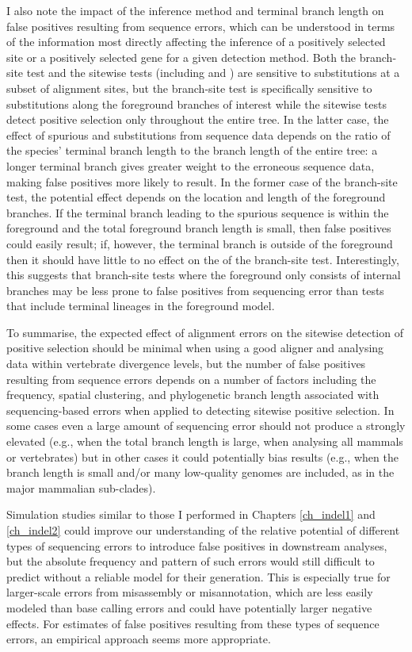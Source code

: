 I also note the impact of the inference method and terminal branch
length on false positives resulting from sequence errors, which can be
understood in terms of the information most directly affecting the
inference of a positively selected site or a positively selected gene
for a given detection method. Both the branch-site test and the
sitewise tests (including \slr and \pamlEight) are sensitive to
substitutions at a subset of alignment sites, but the branch-site test
is specifically sensitive to substitutions along the foreground
branches of interest while the sitewise tests detect positive
selection only throughout the entire tree. In the latter case, the
effect of spurious \syn and \nsyn substitutions from sequence data
depends on the ratio of the species' terminal branch length to the
branch length of the entire tree: a longer terminal branch gives
greater weight to the erroneous sequence data, making false positives
more likely to result. In the former case of the branch-site test, the
potential effect depends on the location and length of the foreground
branches. If the terminal branch leading to the spurious sequence is
within the foreground and the total foreground branch length is small,
then false positives could easily result; if, however, the terminal
branch is outside of the foreground then it should have little to no
effect on the \fpr of the branch-site test. Interestingly, this
suggests that branch-site tests where the foreground only consists of
internal branches may be less prone to false positives from sequencing
error than tests that include terminal lineages in the foreground
model.

To summarise, the expected effect of alignment errors on the sitewise
detection of positive selection should be minimal when using a good
aligner and analysing data within vertebrate divergence levels, but
the number of false positives resulting from sequence errors depends
on a number of factors including the frequency, spatial clustering,
and phylogenetic branch length associated with sequencing-based errors
when applied to detecting sitewise positive selection. In some cases
even a large amount of sequencing error should not produce a strongly
elevated \fpr (e.g., when the total branch length is large, when
analysing all mammals or vertebrates) but in other cases it could
potentially bias results (e.g., when the branch length is small and/or
many low-quality genomes are included, as in the major mammalian
sub-clades).

Simulation studies similar to those I performed in Chapters
\ref{ch_indel1} and \ref{ch_indel2} could improve our understanding of
the relative potential of different types of sequencing errors to
introduce false positives in downstream analyses, but the absolute
frequency and pattern of such errors would still difficult to predict
without a reliable model for their generation. This is especially true
for larger-scale errors from misassembly or misannotation, which are
less easily modeled than base calling errors and could have
potentially larger negative effects. For estimates of false positives
resulting from these types of sequence errors, an empirical approach
seems more appropriate.

